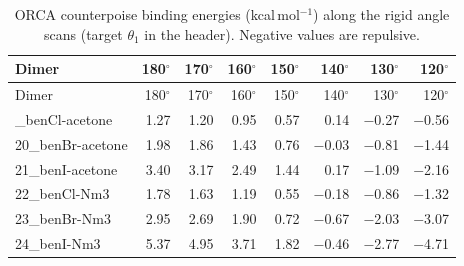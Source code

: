 {\scriptsize
\setlength{\tabcolsep}{3pt}
\begin{longtable}{lrrrrrrr}
\caption{ORCA counterpoise binding energies (kcal\,mol$^{-1}$) along the rigid angle scans (target $\theta_1$ in the header). Negative values are repulsive.}\label{tab:cpangle}\\
\toprule
Dimer & 180$^\circ$ & 170$^\circ$ & 160$^\circ$ & 150$^\circ$ & 140$^\circ$ & 130$^\circ$ & 120$^\circ$\\
\midrule
\endfirsthead
\toprule
Dimer & 180$^\circ$ & 170$^\circ$ & 160$^\circ$ & 150$^\circ$ & 140$^\circ$ & 130$^\circ$ & 120$^\circ$\\
\midrule
\endhead
\bottomrule
\endlastfoot
19\_benCl-acetone & 1.27 & 1.20 & 0.95 & 0.57 & 0.14 & $-$0.27 & $-$0.56\\
20\_benBr-acetone & 1.98 & 1.86 & 1.43 & 0.76 & $-$0.03 & $-$0.81 & $-$1.44\\
21\_benI-acetone & 3.40 & 3.17 & 2.49 & 1.44 & 0.17 & $-$1.09 & $-$2.16\\
22\_benCl-Nm3 & 1.78 & 1.63 & 1.19 & 0.55 & $-$0.18 & $-$0.86 & $-$1.32\\
23\_benBr-Nm3 & 2.95 & 2.69 & 1.90 & 0.72 & $-$0.67 & $-$2.03 & $-$3.07\\
24\_benI-Nm3 & 5.37 & 4.95 & 3.71 & 1.82 & $-$0.46 & $-$2.77 & $-$4.71\\
\end{longtable}}
